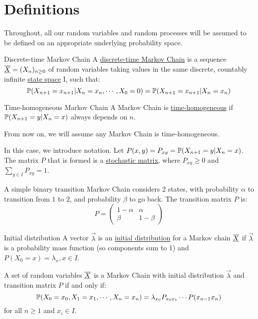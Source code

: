 \documentclass[../Main.tex]{subfiles}
\begin{document}
\section{Definitions}
Throughout, all our random variables and random processes will be assumed to be defined on an appropriate underlying probability space.

\begin{definition}{Discrete-time Markov Chain}
    A \underline{discrete-time Markov Chain} is a sequence $\chain{X} = (X_n)_{n \geq 0}$ of random variables taking values in the same discrete, countably infinite \underline{state space} I, such that:
    \begin{equation*}
        \P(X_{n+1} = x_{n + 1} | X_n = x_n, \cdots, X_0 = 0) = \P(X_{n+1} = x_{n + 1} | X_n = x_n)
    \end{equation*}
\end{definition}
\begin{definition}{Time-homogeneous Markov Chain}
    A Markov Chain is \underline{time-homogeneous} if $\P(X_{n+1} = y | X_n = x)$ always depends on $n$.
\end{definition}
From now on, we will assume any Markov Chain is time-homogeneous.

In this case, we introduce notation. Let $P(x, y) = P_{xy} = \P(X_{n + 1} = y | X_n = x)$. The matrix $P$ that is formed is a \underline{stochastic matrix}, where $P_{xy} \geq 0$ and $\sum_{y \in I} P_{xy} = 1$.

\begin{example}
    A simple binary transition Markov Chain considers 2 states, with probability $\alpha$ to transition from $1$ to $2$, and probability $\beta$ to go back. The transition matrix $P$ is:
    \begin{equation*}
        P = 
        \begin{pmatrix}
            1 - \alpha & \alpha \\
            \beta & 1 - \beta
        \end{pmatrix}
    \end{equation*}
\end{example}
\begin{definition}{Initial distribution}
    A vector $\vec{\lambda}$ is an \underline{initial distribution} for a Markov chain $\chain{X}$ if $\vec{\lambda}$ is a probability mass function (so components sum to 1) and $P(X_0 = x) = \lambda_x, x \in I$.
\end{definition}
\begin{theorem}
    A set of random variables $\chain{X}$ is a Markov Chain with initial distribution $\vec{\lambda}$ and transition matrix $P$ if and only if:
    \begin{equation*}
        \P(X_0 = x_0, X_1 = x_1, \cdots, X_n = x_n) = \lambda_{x_0} P_{x_0 x_1} \cdots P(x_{n-1} x_n)
    \end{equation*}
    for all $n \geq 1$ and $x_i \in I$.
    \label{thmMarkovPathEquivalence}
\end{theorem}
\end{document}
